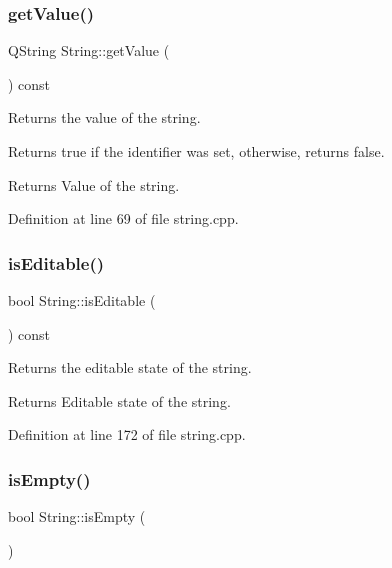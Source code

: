 \subsubsection{\texorpdfstring{get\+Value()}{getValue()}}
{\footnotesize\ttfamily Q\+String String\+::get\+Value (\begin{DoxyParamCaption}{ }\end{DoxyParamCaption}) const}



Returns the value of the string. 

Returns true if the identifier was set, otherwise, returns false. \begin{DoxyReturn}{Returns}
Value of the string. 
\end{DoxyReturn}


Definition at line 69 of file string.\+cpp.

\mbox{\label{classString_a64c436144f008a40743c64b5094700bb}} 
\subsubsection{\texorpdfstring{is\+Editable()}{isEditable()}}
{\footnotesize\ttfamily bool String\+::is\+Editable (\begin{DoxyParamCaption}{ }\end{DoxyParamCaption}) const}



Returns the editable state of the string. 

\begin{DoxyReturn}{Returns}
Editable state of the string. 
\end{DoxyReturn}


Definition at line 172 of file string.\+cpp.

\mbox{\label{classString_a43fe9257fb504215834afa322313f8c9}} 
\subsubsection{\texorpdfstring{is\+Empty()}{isEmpty()}}
{\footnotesize\ttfamily bool String\+::is\+Empty (\begin{DoxyParamCaption}{ }\end{DoxyParamCaption})}



